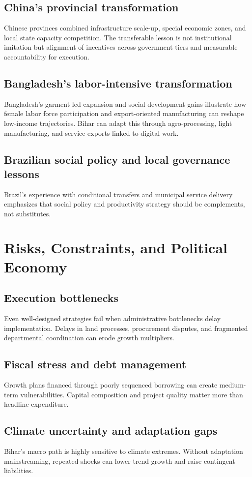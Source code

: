 \documentclass[preprint,12pt]{elsarticle}
\begin{document}
\subsection{China's provincial transformation}
Chinese provinces combined infrastructure scale-up, special economic zones, and local state capacity competition. The transferable lesson is not institutional imitation but alignment of incentives across government tiers and measurable accountability for execution.

\subsection{Bangladesh's labor-intensive transformation}
Bangladesh's garment-led expansion and social development gains illustrate how female labor force participation and export-oriented manufacturing can reshape low-income trajectories. Bihar can adapt this through agro-processing, light manufacturing, and service exports linked to digital work.

\subsection{Brazilian social policy and local governance lessons}
Brazil's experience with conditional transfers and municipal service delivery emphasizes that social policy and productivity strategy should be complements, not substitutes.

\section{Risks, Constraints, and Political Economy}
\subsection{Execution bottlenecks}
Even well-designed strategies fail when administrative bottlenecks delay implementation. Delays in land processes, procurement disputes, and fragmented departmental coordination can erode growth multipliers.

\subsection{Fiscal stress and debt management}
Growth plans financed through poorly sequenced borrowing can create medium-term vulnerabilities. Capital composition and project quality matter more than headline expenditure.

\subsection{Climate uncertainty and adaptation gaps}
Bihar's macro path is highly sensitive to climate extremes. Without adaptation mainstreaming, repeated shocks can lower trend growth and raise contingent liabilities.
\end{document}
